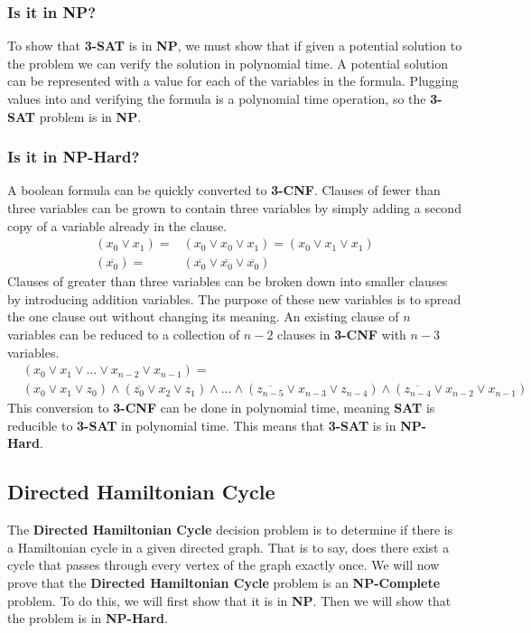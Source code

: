     \subsubsection{Is it in NP?}
        To show that \textbf{3-SAT} is in \textbf{NP}, we must show that if given a potential solution to the problem we can verify the solution in polynomial time. A potential solution can be represented with a value for each of the variables in the formula. Plugging values into and verifying the formula is a polynomial time operation, so the \textbf{3-SAT} problem is in \textbf{NP}.
    \subsubsection{Is it in NP-Hard?}
        A boolean formula can be quickly converted to \textbf{3-CNF}. Clauses of fewer than three variables can be grown to contain three variables by simply adding a second copy of a variable already in the clause.
        \begin{align*}
            (x_0 \lor x_1) = &(x_0 \lor x_0 \lor x_1) = (x_0 \lor x_1 \lor x_1)\\
            (\overline{x_0}) = &(\overline{x_0} \lor \overline{x_0} \lor \overline{x_0})
        \end{align*}
        Clauses of greater than three variables can be broken down into smaller clauses by introducing addition variables. The purpose of these new variables is to spread the one clause out without changing its meaning. An existing clause of $n$ variables can be reduced to a collection of $n-2$ clauses in \textbf{3-CNF} with $n-3$ variables.
        \begin{align*}
            &(x_0 \lor x_1 \lor ... \lor x_{n-2} \lor x_{n-1}) = \\ &(x_0 \lor x_1 \lor z_0) \land (\overline{z_0} \lor x_2 \lor z_1) \land ... \land (\overline{z_{n-5}} \lor x_{n-3} \lor z_{n-4}) \land (\overline{z_{n-4}} \lor x_{n-2} \lor x_{n-1})
        \end{align*}
        This conversion to \textbf{3-CNF} can be done in polynomial time, meaning \textbf{SAT} is reducible to \textbf{3-SAT} in polynomial time. This means that \textbf{3-SAT} is in \textbf{NP-Hard}.

\subsection{Directed Hamiltonian Cycle}
    The \textbf{Directed Hamiltonian Cycle} decision problem is to determine if there is a Hamiltonian cycle in a given directed graph. That is to say, does there exist a cycle that passes through every vertex of the graph exactly once. We will now prove that the \textbf{Directed Hamiltonian Cycle} problem is an \textbf{NP-Complete} problem. To do this, we will first show that it is in \textbf{NP}. Then we will show that the problem is in \textbf{NP-Hard}.
